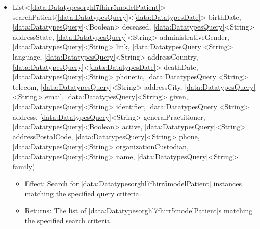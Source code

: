 \begin{description}
\begin{itemize}[noitemsep,nolistsep,leftmargin=-.25cm]
        \begin{itemize}[noitemsep,nolistsep]
           \item Effect: Search for \ref{data:Datatypesorghl7fhirr5modelObservation} instances matching the specified query criteria. 
           \item Returns: The list of \ref{data:Datatypesorghl7fhirr5modelObservation}s matching the specified search criteria.
           \item Sequence Diagrams: None
        \end{itemize}
      \item \textsf{List\textless{}\ref{data:Datatypesorghl7fhirr5modelPatient}\textgreater{} searchPatient(\ref{data:DatatypesQuery}\textless{}\ref{data:DatatypesDate}\textgreater{} birthDate, \ref{data:DatatypesQuery}\textless{}Boolean\textgreater{} deceased, \ref{data:DatatypesQuery}\textless{}String\textgreater{} addressState, \ref{data:DatatypesQuery}\textless{}String\textgreater{} administrativeGender, \ref{data:DatatypesQuery}\textless{}String\textgreater{} link, \ref{data:DatatypesQuery}\textless{}String\textgreater{} language, \ref{data:DatatypesQuery}\textless{}String\textgreater{} addressCountry, \ref{data:DatatypesQuery}\textless{}\ref{data:DatatypesDate}\textgreater{} deathDate, \ref{data:DatatypesQuery}\textless{}String\textgreater{} phonetic, \ref{data:DatatypesQuery}\textless{}String\textgreater{} telecom, \ref{data:DatatypesQuery}\textless{}String\textgreater{} addressCity, \ref{data:DatatypesQuery}\textless{}String\textgreater{} email, \ref{data:DatatypesQuery}\textless{}String\textgreater{} given, \ref{data:DatatypesQuery}\textless{}String\textgreater{} identifier, \ref{data:DatatypesQuery}\textless{}String\textgreater{} address, \ref{data:DatatypesQuery}\textless{}String\textgreater{} generalPractitioner, \ref{data:DatatypesQuery}\textless{}Boolean\textgreater{} active, \ref{data:DatatypesQuery}\textless{}String\textgreater{} addressPostalCode, \ref{data:DatatypesQuery}\textless{}String\textgreater{} phone, \ref{data:DatatypesQuery}\textless{}String\textgreater{} organizationCustodian, \ref{data:DatatypesQuery}\textless{}String\textgreater{} name, \ref{data:DatatypesQuery}\textless{}String\textgreater{} family)}
        \begin{itemize}[noitemsep,nolistsep]
           \item Effect: Search for \ref{data:Datatypesorghl7fhirr5modelPatient} instances matching the specified query criteria. 
           \item Returns: The list of \ref{data:Datatypesorghl7fhirr5modelPatient}s matching the specified search criteria.

\end{itemize}
\end{itemize}
\end{description}
